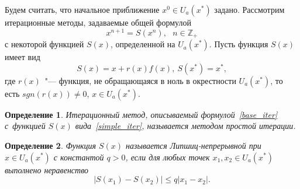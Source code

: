 \documentclass[11pt,a4paper,twoside,listtotoc,bibtotoc]{report}
\numberwithin{equation}{section}
\newtheorem*{definition}{Определение}
\theoremstyle{definition}
\theoremstyle{plain}
\begin{document}
Будем считать, что начальное приближение $x^0 \in U_a(x^*)$ задано.
Рассмотрим итерационные методы, задаваемые общей формулой
%
\begin{equation}
%
    \label{base_iter}
    x^{n+1}=S(x^n), ~~~n\in \mathbb{Z_+}
%
\end{equation}
%
с некоторой функцией $S(x)$, определенной на $U_a(x^*)$.
Пусть функция $S(x)$ имеет вид
%
\begin{equation}
%
    \label{simple_iter}
    S(x)=x+r(x)f(x),
    ~S(x^*)=x^*,
%
\end{equation}
%
где $r(x)$~"--- функция, не обращающаяся в ноль
в окрестности $U_a(x^*)$, то есть $sgn(r(x)) \neq 0$, $x\in U_a(x^*)$.
%
\begin{definition}
%
    Итерационный метод, описываемый формулой~\eqref{base_iter} с~функцией
    $S(x)$ вида~\eqref{simple_iter}, называется методом простой итерации.
%
\end{definition}
%
%
\begin{definition}
%
    Функция $S(x)$ называется Липшиц-непрерывной при $x\in U_a(x^*)$
    с константой $q>0$, если для любых точек $x_1,x_2 \in U_a(x^*)$
    выполнено неравенство
    $$
        |S(x_1) - S(x_2)| \leqslant q|x_1 - x_2|.
    $$
%
\end{definition}
%
%
\end{document}
